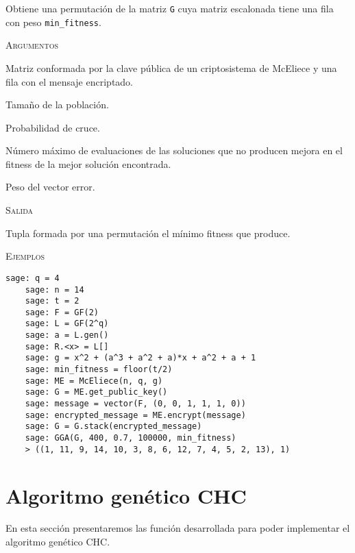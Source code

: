 \begin{description}[leftmargin=1em, font=\normalfont\ttfamily, style=nextline]
  \item[GGA(G, N, pc, max\_reinit, min\_fitness)] Obtiene una permutación de la matriz \texttt{G} cuya matriz escalonada tiene una fila con peso \texttt{min\_fitness}.

  \textsc{Argumentos}
  \begin{description}[font=\normalfont\ttfamily]
    \item[G] Matriz conformada por la clave pública de un criptosistema de McEliece y una fila con el mensaje encriptado.
    \item[N] Tamaño de la población.
    \item[pc] Probabilidad de cruce.
    \item[max\_reinit] Número máximo de evaluaciones de las soluciones que no producen mejora en el fitness de la mejor solución encontrada.
    \item[min\_fitness] Peso del vector error. 
  \end{description}

  \textsc{Salida}
  \begin{description}[font=\normalfont\ttfamily]
    \item[] Tupla formada por una permutación el mínimo fitness que produce.
  \end{description}

  \textsc{Ejemplos}
  \begin{lstlisting}[gobble=4]
    sage: q = 4
    sage: n = 14
    sage: t = 2
    sage: F = GF(2)
    sage: L = GF(2^q)
    sage: a = L.gen()
    sage: R.<x> = L[]
    sage: g = x^2 + (a^3 + a^2 + a)*x + a^2 + a + 1
    sage: min_fitness = floor(t/2)
    sage: ME = McEliece(n, q, g)
    sage: G = ME.get_public_key()
    sage: message = vector(F, (0, 0, 1, 1, 1, 0))
    sage: encrypted_message = ME.encrypt(message)
    sage: G = G.stack(encrypted_message)
    sage: GGA(G, 400, 0.7, 100000, min_fitness)
    > ((1, 11, 9, 14, 10, 3, 8, 6, 12, 7, 4, 5, 2, 13), 1)
  \end{lstlisting}
\end{description}

\section{Algoritmo genético CHC}

En esta sección presentaremos las función desarrollada para poder implementar el algoritmo genético CHC.

